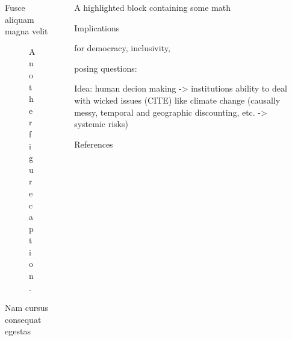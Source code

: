\documentclass[final]{beamer}
\newlength{\sepwidth}
\newlength{\colwidth}
\newcommand{\separatorcolumn}{\begin{column}{\sepwidth}\end{column}}
\begin{document}
\begin{frame}[t]
\begin{columns}[t]
\begin{column}{\colwidth}
\begin{block}{Fusce aliquam magna velit}
    \begin{figure}
      \centering
      \caption{Another figure caption.}
    \end{figure}

  \end{block}

  \begin{block}{Nam cursus consequat egestas}


  \end{block}

\end{column}
\separatorcolumn








\begin{column}{\colwidth}

  \begin{exampleblock}{A highlighted block containing some math}




  \end{exampleblock}

  \begin{block}{Implications}

    

    for democracy, inclusivity, 

    posing questions: 

    Idea: human decion making -> institutions
    ability to deal with wicked issues (CITE) like climate change (causally messy, temporal and geographic discounting, etc. -> systemic risks) 

      
  \end{block}

  \begin{block}{References}

    \nocite{*}
    \footnotesize{}

  \end{block}

\end{column}

\separatorcolumn
\end{columns}
\end{frame}
\end{document}

